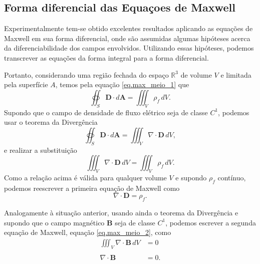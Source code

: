 \subsection{Forma diferencial das Equa\c{c}oes de Maxwell}

Experimentalmente tem-se obtido excelentes resultados aplicando as equa\c{c}\~oes de Maxwell em sua forma diferencial, onde s\~ao assumidas algumas hip\'oteses acerca da diferenciabilidade dos campos envolvidos. Utilizando essas hip\'oteses, podemos transcrever as equa\c{c}\~oes da forma integral para a forma diferencial.

Portanto, considerando uma regi\~ao fechada do espa\c{c}o $\mathbb{R}^3$ de volume $V$ e limitada pela superf\'icie $A$, temos pela equa\c{c}\~ao \ref{eq.max_meio_1} que
\begin{equation*}
\oiint_S\mathbf{D}\cdot d\mathbf{A}=\iiint_{V}\rho_f\,dV.
\end{equation*}
Supondo que o campo de densidade de fluxo el\'etrico seja de classe $C^1$, podemos usar o teorema da Diverg\^encia
\begin{equation*}
\oiint_S\mathbf{D}\cdot d\mathbf{A}=\iiint_V\nabla\cdot\mathbf{D}\,dV,
\end{equation*}
e realizar a substitui\c{c}\~ao
\begin{equation*}
\iiint_V\nabla\cdot\mathbf{D}\,dV=\iiint_{V}\rho_f\,dV.
\end{equation*}
Como a rela\c{c}\~ao acima \'e v\'alida para qualquer volume $V$ e supondo $\rho_f$ cont\'inuo, podemos reescrever a primeira equa\c{c}\~ao de Maxwell como
\begin{equation*}
\nabla\cdot\mathbf{D}=\rho_f.
\end{equation*}

Analogamente \`a situa\c{c}\~ao anterior, usando ainda o teorema da Diverg\^encia e supondo que o campo magn\'etico $\mathbf{B}$ seja de classe $C^1$, podemos escrever a segunda equa\c{c}\~ao de Maxwell, equa\c{c}\~ao \ref{eq.max_meio_2}, como
\begin{align*}
\iiint_V\nabla\cdot\mathbf{B}\,dV&=0\\\\
\nabla\cdot\mathbf{B}&=0.
\end{align*}

